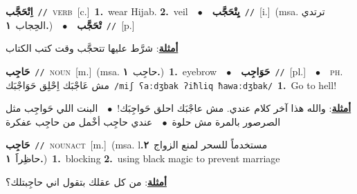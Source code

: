 \documentclass[10pt,a4paper,twoside]{article} %
\begin{document}
\begin{multicols}{2}
{{{{{{{{{{\setlength\topsep{0pt}\textbf{\foreignlanguage{arabic}{اِتْحَجَّب}}\ {\color{gray}\texttt{//}\color{black}}\ \textsc{verb}\ [c.]\ \textbf{1.}~wear Hijab.  \textbf{2.}~veil\ \ $\bullet$\ \ \setlength\topsep{0pt}\textbf{\foreignlanguage{arabic}{يِتْحَجَّب}}\ {\color{gray}\texttt{//}\color{black}}\ [i.]\ \color{gray}(msa. \foreignlanguage{arabic}{ترتدي الحِجاب}~\foreignlanguage{arabic}{\textbf{١.}})\color{black}\ \ $\bullet$\ \ \setlength\topsep{0pt}\textbf{\foreignlanguage{arabic}{تْحَجَّب}}\ {\color{gray}\texttt{//}\color{black}}\ [p.]\  \begin{flushright}\color{gray}\foreignlanguage{arabic}{\textbf{\underline{\foreignlanguage{arabic}{أمثلة}}}: شرَّط عليها تتحجَّب وقت كتب الكتاب}\end{flushright}\color{black}} \vspace{2mm}

{\setlength\topsep{0pt}\textbf{\foreignlanguage{arabic}{حَاجِب}}\ {\color{gray}\texttt{//}\color{black}}\ \textsc{noun}\ [m.]\ \color{gray}(msa. \foreignlanguage{arabic}{حاجِب}~\foreignlanguage{arabic}{\textbf{١.}})\color{black}\ \textbf{1.}~eyebrow\ \ $\bullet$\ \ \setlength\topsep{0pt}\textbf{\foreignlanguage{arabic}{حَوَاجِب}}\ {\color{gray}\texttt{//}\color{black}}\ [pl.]\ \ $\bullet$\ \ \textsc{ph.} \color{gray} \foreignlanguage{arabic}{مش عَاجْبَك اِحْلِق حَوَاجْبَك}\color{black}\ {\color{gray}\texttt{/{\sffamily miʃ ʕaːdʒbak ʔiħliq ħawaːdʒbak}/}\color{black}}\ \textbf{1.}~Go to hell!\  \begin{flushright}\color{gray}\foreignlanguage{arabic}{\textbf{\underline{\foreignlanguage{arabic}{أمثلة}}}: والله هذا آخر كلام عندي. مش عاجْبَك احلق حَواجِبَك!\ $\bullet$\ \  البنت اللي حَواجِب مثل الصرصور بالمرة مش حلوة\ $\bullet$\ \  عندي حاجِب أخْمل من حاجِب عفكرة}\end{flushright}\color{black}} \vspace{2mm}

{\setlength\topsep{0pt}\textbf{\foreignlanguage{arabic}{حَاجِب}}\ {\color{gray}\texttt{//}\color{black}}\ \textsc{noun\textunderscore act}\ [m.]\ \color{gray}(msa. lمستخدماً \foreignlanguage{arabic}{للسحر لمنع الزواج}~\foreignlanguage{arabic}{\textbf{٢.}}  \foreignlanguage{arabic}{حاظِراََ}~\foreignlanguage{arabic}{\textbf{١.}})\color{black}\ \textbf{1.}~blocking  \textbf{2.}~using black magic to prevent marriage\  \begin{flushright}\color{gray}\foreignlanguage{arabic}{\textbf{\underline{\foreignlanguage{arabic}{أمثلة}}}: من كل عقلك بتقول اني حاجِبتلك؟}\end{flushright}\color{black}} \vspace{2mm}

}}}}}}}}}
\end{multicols}
\end{document}
